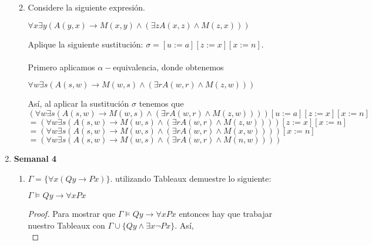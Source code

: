 \documentclass[letterpaper,12pt]{article}
\begin{document}
\begin{enumerate}
\begin{enumerate}
        \newpage
        \item Considere la siguiente expresión.

        \begin{center}
            $\forall x \exists y (A(y,x) \rightarrow M(x,y) \land 
            (\exists z A(x,z) \land M(z,x)))$
        \end{center}

        Aplique la siguiente sustitución: $\sigma = [u := a][z := x][x := n]$.\\ \\
         Primero aplicamos $\alpha-$equivalencia, donde 
        obtenemos 

        \begin{center}
            $\forall w \exists s (A(s,w) \rightarrow M(w,s) \land 
            (\exists r A(w,r) \land M(z,w)))$
        \end{center}

        Así, al aplicar la sustitución $\sigma$ tenemos que \\
        $(\forall w \exists s (A(s,w) \rightarrow M(w,s) \land 
        (\exists r A(w,r) \land M(z,w))))[u := a][z := x][x := n]$ \\  
        $= (\forall w \exists s (A(s,w) \rightarrow M(w,s) \land 
        (\exists r A(w,r) \land M(z,w))))[z := x][x := n]$ \\
        $ = (\forall w \exists s (A(s,w) \rightarrow M(w,s) \land 
        (\exists r A(w,r) \land M(x,w))))[x := n]$ \\
        $ = (\forall w \exists s (A(s,w) \rightarrow M(w,s) \land 
        (\exists r A(w,r) \land M(n,w))))$ 

    \end{enumerate}

    \item \textbf{Semanal 4}
    \begin{enumerate}
        \item $\Gamma = \{ \forall x (Qy \rightarrow Px)\}$. utilizando Tableaux
        demuestre lo siguiente: 

        \begin{center}
            $\Gamma \models Qy \rightarrow \forall x Px$
        \end{center}

        \begin{proof}
            Para mostrar que $\Gamma \models Qy \rightarrow \forall x Px$ 
            entonces hay que trabajar nuestro Tableaux con 
            $\Gamma \cup \{Qy \land \exists x \neg Px\}$. Así, \\ 


\end{proof}
\end{enumerate}
\end{enumerate}
\end{document}
